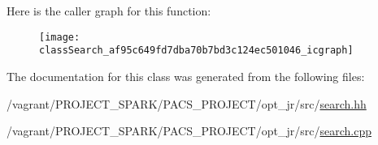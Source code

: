 Here is the caller graph for this function\-:\nopagebreak
\begin{figure}[H]
\begin{center}
\leavevmode
\texttt{[image: classSearch\_af95c649fd7dba70b7bd3c124ec501046\_icgraph]}
\end{center}
\end{figure}




The documentation for this class was generated from the following files\-:\begin{DoxyCompactItemize}
\item 
/vagrant/\-P\-R\-O\-J\-E\-C\-T\-\_\-\-S\-P\-A\-R\-K/\-P\-A\-C\-S\-\_\-\-P\-R\-O\-J\-E\-C\-T/opt\-\_\-jr/src/\hyperlink{search_8hh}{search.\-hh}\item 
/vagrant/\-P\-R\-O\-J\-E\-C\-T\-\_\-\-S\-P\-A\-R\-K/\-P\-A\-C\-S\-\_\-\-P\-R\-O\-J\-E\-C\-T/opt\-\_\-jr/src/\hyperlink{search_8cpp}{search.\-cpp}\end{DoxyCompactItemize}
